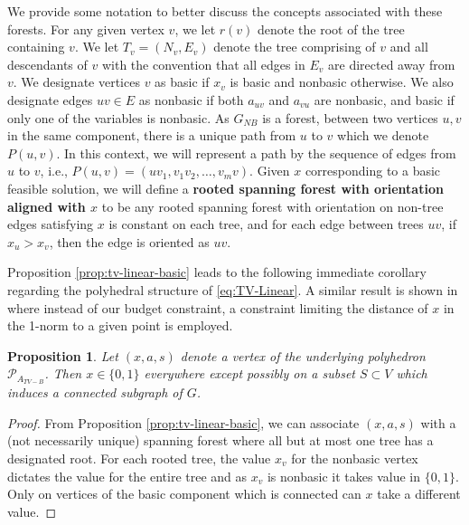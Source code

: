 \documentclass[titlepage,11pt]{article}
\newtheorem{proposition}{Proposition}
\begin{document}
We provide some notation to better discuss the concepts associated with these forests. For any given vertex $v$, we let $r(v)$ denote the root of the tree containing $v$. We let $T_v = (N_v, E_v)$ denote the tree comprising of $v$ and all descendants of $v$ with the convention that all edges in $E_v$ are directed away from $v$. We designate vertices $v$ as basic if $x_v$ is basic and nonbasic otherwise. We also designate edges $uv \in E$ as nonbasic if both $a_{uv}$ and $a_{vu}$ are nonbasic, and basic if only one of the variables is nonbasic. 
As $G_{NB}$ is a forest, between two vertices $u,v$ in the same component, there is a unique path from $u$ to $v$ which we denote $P(u,v)$. In this context, we will represent a path by the sequence of edges from $u$ to $v$, i.e., $P(u,v) = (uv_1, v_1v_2, \ldots, v_mv)$. 
Given $x$ corresponding to a basic feasible solution, we will define a \textbf{rooted spanning forest with orientation aligned with $x$} to be any rooted spanning forest with orientation on non-tree edges satisfying $x$ is constant on each tree, and for each edge between trees $uv$, if $x_u > x_v$, then the edge is oriented as $uv$. 

Proposition \ref{prop:tv-linear-basic} leads to the following immediate corollary regarding the polyhedral structure of \eqref{eq:TV-Linear}. A similar result is shown in \cite{manns2024discrete} where instead of our budget constraint, a constraint limiting the distance of $x$ in the 1-norm to a given point is employed.

\begin{proposition}\label{prop:TV-B-Vertices}
    Let $(x, a, s)$ denote a vertex of the underlying polyhedron $\mathcal{P}_{A_{TV-B}}$. Then $x \in \{0,1\}$ everywhere except possibly on a subset $S \subset V$ which induces a connected subgraph of $G$.
\end{proposition}
\begin{proof}
    From Proposition \ref{prop:tv-linear-basic}, we can associate $(x, a, s)$ with a (not necessarily unique) spanning forest where all but at most one tree has a designated root. For each rooted tree, the value $x_v$ for the nonbasic vertex dictates the value for the entire tree and as $x_v$ is nonbasic it takes value in $\{0, 1\}$. Only on vertices of the basic component which is connected can $x$ take a different value. 
\end{proof}

\end{document}
